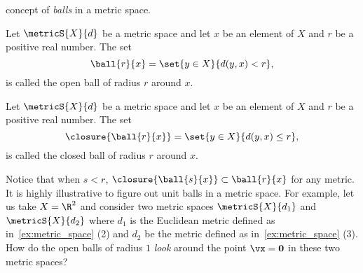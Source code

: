 concept of \emph{balls} in a metric space.
\begin{Definition}[name=Open Ball]
    Let $\metricS{X}{d}$ be a metric space and let $x$ be an element of $X$ and $r$ be a positive real number.
    The set
    \[\ball{r}{x} = \set{y\in X}{d(y,x) < r},\]
    is called the open ball of radius $r$ around $x$.
\end{Definition}
\begin{Definition}[name=Closed Ball]
    Let $\metricS{X}{d}$ be a metric space and let $x$ be an element of $X$ and $r$ be a positive real number.
    The set
    \[\closure{\ball{r}{x}} = \set{y\in X}{d(y,x) \leq r},\]
    is called the closed ball of radius $r$ around $x$.
\end{Definition}
Notice that when $s < r$, $\closure{\ball{s}{x}} \subset \ball{r}{x}$ for any metric.
It is highly illustrative to figure out unit balls in a metric space. For example, let us take $X = \R^2$ and
consider two metric spaces $\metricS{X}{d_1}$ and $\metricS{X}{d_2}$ where $d_1$ is the Euclidean metric
defined as in~\ref{ex:metric_space} (2) and $d_2$ be the metric defined as in~\ref{ex:metric_space} (3).
How do the open balls of radius $1$ \emph{look} around the point $\vx = \mathbf{0}$ 
in these two metric spaces?

